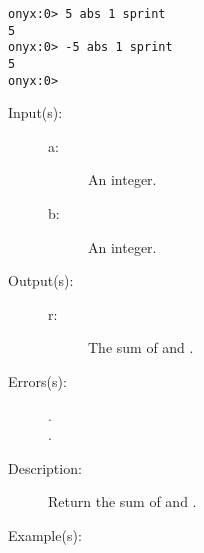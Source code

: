 \begin{description}
\begin{description}
\begin{verbatim}
onyx:0> 5 abs 1 sprint
5
onyx:0> -5 abs 1 sprint
5
onyx:0>
		\end{verbatim}
	\end{description}
\label{systemdict:add}
\item[{\onyxop{a b}{add}{r}}: ]
	\begin{description}\item[]
	\item[Input(s): ]
		\begin{description}\item[]
		\item[a: ]
			An integer.
		\item[b: ]
			An integer.
		\end{description}
	\item[Output(s): ]
		\begin{description}\item[]
		\item[r: ]
			The sum of  and .
		\end{description}
	\item[Errors(s): ]
		\begin{description}\item[]
		\item[.]
		\item[.]
		\end{description}
	\item[Description: ]
		Return the sum of  and .
	\item[Example(s): ]\begin{verbatim}


\end{verbatim}
\end{description}
\end{description}
